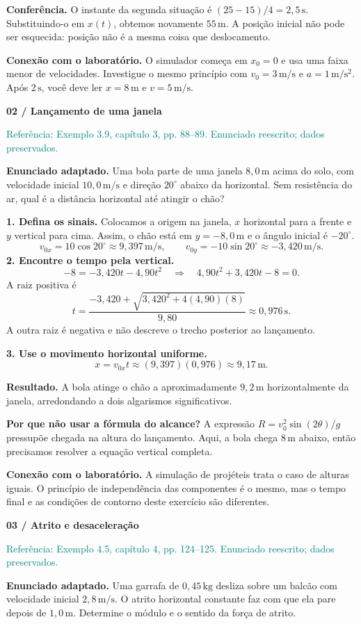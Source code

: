 \documentclass[11pt,a4paper]{article}
\newcommand{\result}[1]{\par\colorbox{pale}{\parbox{\dimexpr\linewidth-2\fboxsep}{\vspace{4pt}\textbf{Resultado.} #1\vspace{4pt}}}\par}
\newcommand{\source}[1]{{\small\textcolor{teal}{Referência: #1. Enunciado reescrito; dados preservados.}}\par}
\newcommand{\exercise}[2]{{\LARGE\bfseries\color{ink}#1}\par\vspace{3pt}{\large #2}\par\vspace{5pt}}
\begin{document}
\textbf{Conferência.} O instante da segunda situação é $(25-15)/4=2{,}5\,\mathrm s$. Substituindo-o em $x(t)$, obtemos novamente $55\,\mathrm m$. A posição inicial não pode ser esquecida: posição não é a mesma coisa que deslocamento.

\textbf{Conexão com o laboratório.} O simulador começa em $x_0=0$ e usa uma faixa menor de velocidades. Investigue o mesmo princípio com $v_0=3\,\mathrm{m/s}$ e $a=1\,\mathrm{m/s^2}$. Após $2\,\mathrm s$, você deve ler $x=8\,\mathrm m$ e $v=5\,\mathrm{m/s}$.

\newpage
\exercise{02 / Lançamento de uma janela}{Quando as alturas são diferentes}
\source{Exemplo 3.9, capítulo 3, pp. 88--89}
\textbf{Enunciado adaptado.} Uma bola parte de uma janela $8{,}0\,\mathrm m$ acima do solo, com velocidade inicial $10{,}0\,\mathrm{m/s}$ e direção $20^\circ$ abaixo da horizontal. Sem resistência do ar, qual é a distância horizontal até atingir o chão?

\textbf{1. Defina os sinais.} Colocamos a origem na janela, $x$ horizontal para a frente e $y$ vertical para cima. Assim, o chão está em $y=-8{,}0\,\mathrm m$ e o ângulo inicial é $-20^\circ$.
\[
v_{0x}=10\cos20^\circ\approx9{,}397\,\mathrm{m/s},\qquad
v_{0y}=-10\sin20^\circ\approx-3{,}420\,\mathrm{m/s}.
\]
\textbf{2. Encontre o tempo pela vertical.}
\[
-8=-3{,}420t-4{,}90t^2
\quad\Longrightarrow\quad4{,}90t^2+3{,}420t-8=0.
\]
A raiz positiva é
\[
t=\frac{-3{,}420+\sqrt{3{,}420^2+4(4{,}90)(8)}}{9{,}80}
\approx0{,}976\,\mathrm s.
\]
A outra raiz é negativa e não descreve o trecho posterior ao lançamento.

\textbf{3. Use o movimento horizontal uniforme.}
\[
x=v_{0x}t\approx(9{,}397)(0{,}976)\approx\boxed{9{,}17\,\mathrm m}.
\]
\result{A bola atinge o chão a aproximadamente $9{,}2\,\mathrm m$ horizontalmente da janela, arredondando a dois algarismos significativos.}

\textbf{Por que não usar a fórmula do alcance?} A expressão $R=v_0^2\sin(2\theta)/g$ pressupõe chegada na altura do lançamento. Aqui, a bola chega $8\,\mathrm m$ abaixo, então precisamos resolver a equação vertical completa.

\textbf{Conexão com o laboratório.} A simulação de projéteis trata o caso de alturas iguais. O princípio de independência das componentes é o mesmo, mas o tempo final e as condições de contorno deste exercício são diferentes.

\newpage
\exercise{03 / Atrito e desaceleração}{Da distância de parada à força}
\source{Exemplo 4.5, capítulo 4, pp. 124--125}
\textbf{Enunciado adaptado.} Uma garrafa de $0{,}45\,\mathrm{kg}$ desliza sobre um balcão com velocidade inicial $2{,}8\,\mathrm{m/s}$. O atrito horizontal constante faz com que ela pare depois de $1{,}0\,\mathrm m$. Determine o módulo e o sentido da força de atrito.
\end{document}
